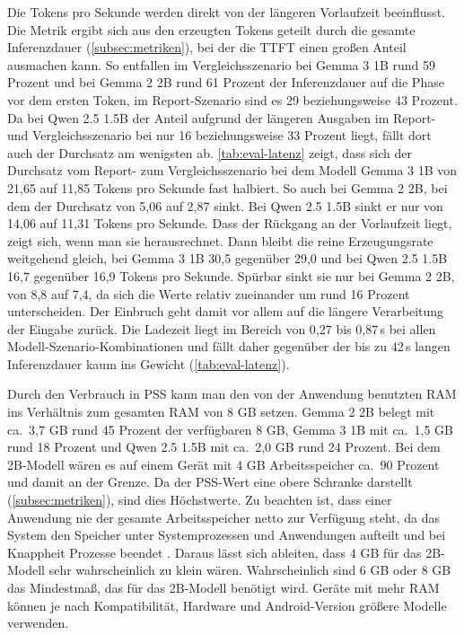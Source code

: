 \noindent Die Tokens pro Sekunde werden direkt von der längeren Vorlaufzeit beeinflusst. Die Metrik ergibt sich aus den erzeugten Tokens geteilt durch die gesamte Inferenzdauer (\autoref{subsec:metriken}), bei der die \ac{TTFT} einen großen Anteil ausmachen kann. So entfallen im Vergleichsszenario bei Gemma 3 1B rund 59 Prozent und bei Gemma 2 2B rund 61 Prozent der Inferenzdauer auf die Phase vor dem ersten Token, im Report-Szenario sind es 29 beziehungsweise 43 Prozent. Da bei Qwen 2.5 1.5B der Anteil aufgrund der längeren Ausgaben im Report- und Vergleichsszenario bei nur 16 beziehungsweise 33 Prozent liegt, fällt dort auch der Durchsatz am wenigsten ab. \autoref{tab:eval-latenz} zeigt, dass sich der Durchsatz vom Report- zum Vergleichsszenario bei dem Modell Gemma 3 1B von 21,65 auf 11,85 Tokens pro Sekunde fast halbiert. So auch bei Gemma 2 2B, bei dem der Durchsatz von 5,06 auf 2,87 sinkt. Bei Qwen 2.5 1.5B sinkt er nur von 14,06 auf 11,31 Tokens pro Sekunde. Dass der Rückgang an der Vorlaufzeit liegt, zeigt sich, wenn man sie herausrechnet. Dann bleibt die reine Erzeugungsrate weitgehend gleich, bei Gemma 3 1B 30,5 gegenüber 29,0 und bei Qwen 2.5 1.5B 16,7 gegenüber 16,9 Tokens pro Sekunde. Spürbar sinkt sie nur bei Gemma 2 2B, von 8,8 auf 7,4, da sich die Werte relativ zueinander um rund 16 Prozent unterscheiden. Der Einbruch geht damit vor allem auf die längere Verarbeitung der Eingabe zurück. Die Ladezeit liegt im Bereich von 0,27 bis 0,87\,s bei allen Modell-Szenario-Kombinationen und fällt daher gegenüber der bis zu 42\,s langen Inferenzdauer kaum ins Gewicht (\autoref{tab:eval-latenz}).
\vspace{\baselineskip}

\noindent Durch den Verbrauch in \ac{PSS} kann man den von der Anwendung benutzten \ac{RAM} ins Verhältnis zum gesamten \ac{RAM} von 8 GB setzen. Gemma 2 2B belegt mit ca.\ 3,7 GB rund 45 Prozent der verfügbaren 8 GB, Gemma 3 1B mit ca.\ 1,5 GB rund 18 Prozent und Qwen 2.5 1.5B mit ca.\ 2,0 GB rund 24 Prozent. Bei dem 2B-Modell wären es auf einem Gerät mit 4 GB Arbeitsspeicher ca.\ 90 Prozent und damit an der Grenze. Da der \ac{PSS}-Wert eine obere Schranke darstellt (\autoref{subsec:metriken}), sind dies Höchstwerte. Zu beachten ist, dass einer Anwendung nie der gesamte Arbeitsspeicher netto zur Verfügung steht, da das System den Speicher unter Systemprozessen und Anwendungen aufteilt und bei Knappheit Prozesse beendet \autocite{android_memory}. Daraus lässt sich ableiten, dass 4 GB für das 2B-Modell sehr wahrscheinlich zu klein wären. Wahrscheinlich sind 6 GB oder 8 GB das Mindestmaß, das für das 2B-Modell benötigt wird. Geräte mit mehr \ac{RAM} können je nach Kompatibilität, Hardware und Android-Version größere Modelle verwenden.
\vspace{\baselineskip}

